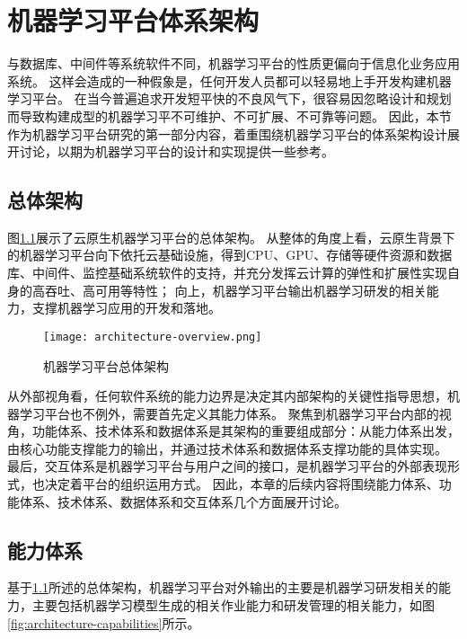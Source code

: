 
\chapter{机器学习平台体系架构}

与数据库、中间件等系统软件不同，机器学习平台的性质更偏向于信息化业务应用系统。
这样会造成的一种假象是，任何开发人员都可以轻易地上手开发构建机器学习平台。
在当今普遍追求开发短平快的不良风气下，很容易因忽略设计和规划而导致构建成型的机器学习平不可维护、不可扩展、不可靠等问题。
因此，本节作为机器学习平台研究的第一部分内容，着重围绕机器学习平台的体系架构设计展开讨论，以期为机器学习平台的设计和实现提供一些参考。


\section{总体架构}
\label{sec:architecture-overview}

图\ref{fig:architecture-overview}展示了云原生机器学习平台的总体架构。
从整体的角度上看，云原生背景下的机器学习平台向下依托云基础设施，得到CPU、GPU、存储等硬件资源和数据库、中间件、监控基础系统软件的支持，并充分发挥云计算的弹性和扩展性实现自身的高吞吐、高可用等特性；
向上，机器学习平台输出机器学习研发的相关能力，支撑机器学习应用的开发和落地。

\begin{figure}
  \centering
  \texttt{[image: architecture-overview.png]}
  \caption{机器学习平台总体架构}
  \label{fig:architecture-overview}
\end{figure}

从外部视角看，任何软件系统的能力边界是决定其内部架构的关键性指导思想，机器学习平台也不例外，需要首先定义其能力体系。
聚焦到机器学习平台内部的视角，功能体系、技术体系和数据体系是其架构的重要组成部分：从能力体系出发，由核心功能支撑能力的输出，并通过技术体系和数据体系支撑功能的具体实现。
最后，交互体系是机器学习平台与用户之间的接口，是机器学习平台的外部表现形式，也决定着平台的组织运用方式。
因此，本章的后续内容将围绕能力体系、功能体系、技术体系、数据体系和交互体系几个方面展开讨论。


\section{能力体系}

基于\ref{sec:architecture-overview}所述的总体架构，机器学习平台对外输出的主要是机器学习研发相关的能力，主要包括机器学习模型生成的相关作业能力和研发管理的相关能力，如图\ref{fig:architecture-capabilities}所示。

